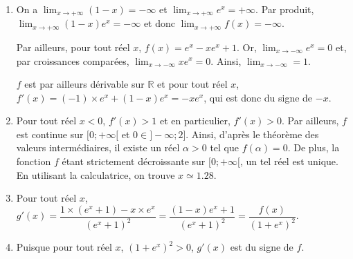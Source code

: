 \documentclass[11pt,fleqn, openany]{book} %
\begin{document}
\begin{solution}\hspace{0pt}
\begin{enumerate}
\item On a $\displaystyle\lim_{x \to + \infty}(1-x)=-\infty$ et $\displaystyle\lim_{x \to +\infty}e^x=+\infty$. Par produit, $\displaystyle\lim_{x \to + \infty}(1-x)e^x=-\infty$ et donc $\displaystyle\lim_{x \to + \infty}f(x)=-\infty$.

Par ailleurs, pour tout réel $x$, $f(x)=e^x-xe^x+1$. Or, $\displaystyle\lim_{x \to - \infty}e^x=0$ et, par croissances comparées, $\displaystyle\lim_{x \to - \infty}xe^x=0$. Ainsi, $\displaystyle\lim_{x \to - \infty}=1$.

$f$ est par ailleurs dérivable sur $\mathbb{R}$ et pour tout réel $x$, $f'(x)=(-1) \times e^x + (1-x)e^x = -xe^x$, qui est donc du signe de $-x$.

\begin{center}
\end{center}

\item Pour tout réel $x<0$, $f'(x)>1$ et en particulier, $f'(x)>0$. Par ailleurs, $f$ est continue sur $[0;+\infty[$ et $ 0 \in ]-\infty;2]$. Ainsi, d'après le théorème des valeurs intermédiaires, il existe un réel $\alpha >0$ tel que $f(\alpha)=0$. De plus, la fonction $f$ étant strictement décroissante sur $[0;+\infty[$, un tel réel est unique. En utilisant la calculatrice, on trouve $x\simeq 1.28$.

\item Pour tout réel $x$, $g'(x)=\dfrac{1 \times (e^x+1)-x \times e^x}{(e^x+1)^2}=\dfrac{(1-x)e^x+1}{(e^x+1)^2}=\dfrac{f(x)}{(1+e^x)^2}$.

\item Puisque pour tout réel $x$, $(1+e^x)^2>0$, $g'(x)$ est du signe de $f$.


\begin{center}
\end{center}
\end{enumerate}
\end{solution}
\end{document}
